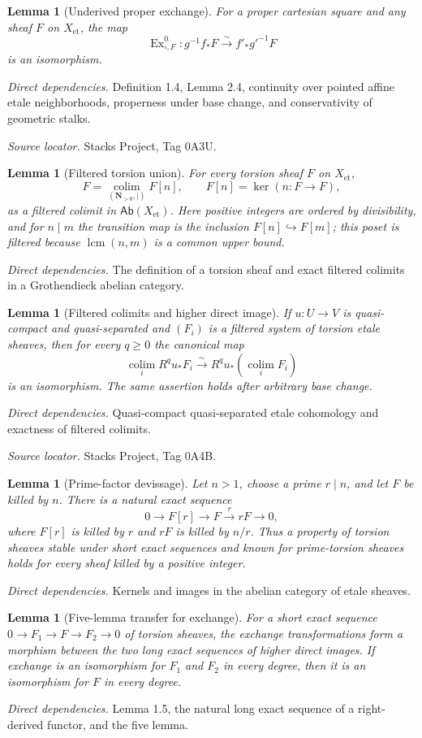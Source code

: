 \documentclass[10pt]{article}
\newtheorem{lemma}[theorem]{Lemma}
\theoremstyle{definition}
\newcommand{\Ab}{\mathsf{Ab}}
\newcommand{\colim}{\operatorname*{colim}}
\newcommand{\Et}{\mathrm{et}}
\newcommand{\Ex}{\operatorname{Ex}}
\newcommand{\deps}[1]{\par\smallskip\textit{Direct dependencies.} #1\par}
\newcommand{\sources}[1]{\par\textit{Source locator.} #1\par}
\begin{document}
\begin{lemma}[Underived proper exchange]
For a proper cartesian square and any sheaf $F$ on $X_{\Et}$, the map
\[
 \Ex^0_{\square,F}:g^{-1}f_*F\xrightarrow{\sim}f'_*g'^{-1}F
\]
is an isomorphism.
\end{lemma}
\deps{Definition 1.4, Lemma 2.4, continuity over pointed affine etale
neighborhoods, properness under base change, and conservativity of
geometric stalks.}
\sources{Stacks Project, Tag 0A3U.}

\begin{lemma}[Filtered torsion union]
For every torsion sheaf $F$ on $X_{\Et}$,
\[
 F=\colim_{(\mathbf N_{>0},\mid)}F[n],\qquad
 F[n]=\ker(n:F\to F),
\]
as a filtered colimit in $\Ab(X_{\Et})$.  Here positive integers are
ordered by divisibility, and for $n\mid m$ the transition map is the
inclusion $F[n]\hookrightarrow F[m]$; this poset is filtered because
$\operatorname{lcm}(n,m)$ is a common upper bound.
\end{lemma}
\deps{The definition of a torsion sheaf and exact filtered colimits in a
Grothendieck abelian category.}

\begin{lemma}[Filtered colimits and higher direct image]
If $u:U\to V$ is quasi-compact and quasi-separated and $(F_i)$ is a
filtered system of torsion etale sheaves, then for every $q\geq0$ the
canonical map
\[
 \colim_i R^qu_*F_i\xrightarrow{\sim}R^qu_*(\colim_iF_i)
\]
is an isomorphism.  The same assertion holds after arbitrary base change.
\end{lemma}
\deps{Quasi-compact quasi-separated etale cohomology and exactness of
filtered colimits.}
\sources{Stacks Project, Tag 0A4B.}

\begin{lemma}[Prime-factor devissage]
Let $n>1$, choose a prime $r\mid n$, and let $F$ be killed by $n$.  There
is a natural exact sequence
\[
 0\longrightarrow F[r]\longrightarrow F
 \xrightarrow{r} rF\longrightarrow0,
\]
where $F[r]$ is killed by $r$ and $rF$ is killed by $n/r$.  Thus a property
of torsion sheaves stable under short exact sequences and known for
prime-torsion sheaves holds for every sheaf killed by a positive integer.
\end{lemma}
\deps{Kernels and images in the abelian category of etale sheaves.}

\begin{lemma}[Five-lemma transfer for exchange]
For a short exact sequence $0\to F_1\to F\to F_2\to0$ of torsion sheaves,
the exchange transformations form a morphism between the two long exact
sequences of higher direct images.  If exchange is an isomorphism for
$F_1$ and $F_2$ in every degree, then it is an isomorphism for $F$ in every
degree.
\end{lemma}
\deps{Lemma 1.5, the natural long exact sequence of a right-derived
functor, and the five lemma.}
\end{document}
